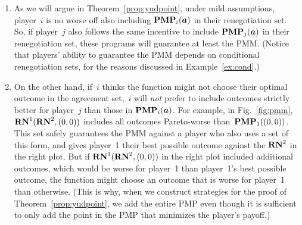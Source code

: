 \documentclass[sigconf]{aamas}
\theoremstyle{definition}
\begin{document}
\begin{enumerate}
    \item As we will argue in Theorem~\ref{prop:yudpoint},
    under mild assumptions,
    player~$i$
    is no worse off also including 
    $\mathbf{PMP}_i(\boldsymbol{a})$ in their 
    renegotiation set. So, if player~$j$ also follows the same incentive to include $\mathbf{PMP}_j(\boldsymbol{a})$ in their 
    renegotiation set, 
    these programs will guarantee at least the PMM.
    (Notice
    that players' ability
    to guarantee
    the PMM depends
    on conditional renegotiation sets, for
    the reasons discussed in
    Example~\ref{ex:cond}.)
    \item On the other hand, if~$i$ thinks
    the \selfunction{}
    function
    might not choose their optimal outcome in the agreement set,~$i$
    will \textit{not} prefer to include outcomes
    strictly better for player~$j$ than those in $\mathbf{PMP}_i(\boldsymbol{a})$.
    For
    example,
    in
    Fig.~\ref{fig:pmm},
    $\mathbf{RN}^{1}(\mathbf{RN}^{2}, (0,0))$ includes all outcomes Pareto-worse than~$\mathbf{PMP}_1((0,0))$.
    This set
    safely
    guarantees
    the PMM against a player who
    also uses a set of this form,
    and gives player~1 their best possible outcome
    against the $\mathbf{RN}^{2}$ in the right plot.
    But if  $\mathbf{RN}^{1}(\mathbf{RN}^{2}, (0,0))$ in the right plot included additional outcomes,
    which would be worse for player~1 than player~1's best possible outcome,
    the \selfunction{} function might choose
    an outcome
    that is worse for player~1
    than otherwise.
    (This is why, when we construct strategies
    for
    the proof of Theorem~\ref{prop:yudpoint},
    we add the entire PMP even though it is sufficient to only
    add
    the point in the PMP that minimizes the player's payoff.)
\end{enumerate}
\end{document}
